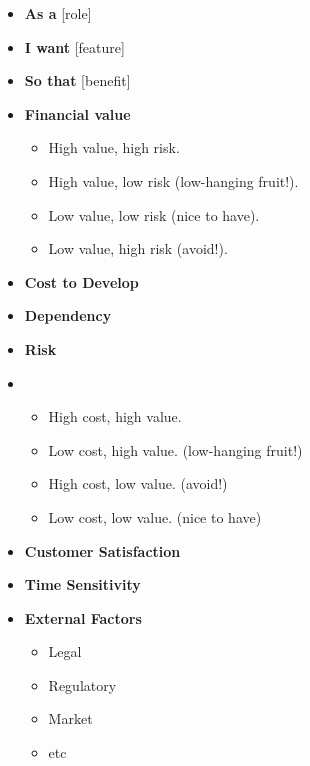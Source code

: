 \documentclass[10pt]{article}
\begin{document}
\begin{multicols}{5}
\begin{block}
  \begin{itemize}
    \item \textbf{As a} [role]
    \item \textbf{I want} [feature]
    \item \textbf{So that} [benefit]
  \end{itemize}
\end{block}

\begin{block}
  \begin{itemize}
    \item \textbf{Financial value}
    \begin{itemize}
      \item High value, high risk.
      \item High value, low risk (low-hanging fruit!).
      \item Low value, low risk (nice to have).
      \item Low value, high risk (avoid!).
    \end{itemize}
    \item \textbf{Cost to Develop}
    \item \textbf{Dependency}
    \item \textbf{Risk}
    \item \begin{itemize}
      \item High cost, high value.
      \item Low cost, high value. (low-hanging fruit!)
      \item High cost, low value. (avoid!)
      \item Low cost, low value. (nice to have)
    \end{itemize}
    \item \textbf{Customer Satisfaction}
    \item \textbf{Time Sensitivity}
    \item \textbf{External Factors}
    \begin{itemize}
      \item Legal
      \item Regulatory
      \item Market
      \item etc
    \end{itemize}
  \end{itemize}
\end{block}



\end{multicols}
\end{document}
